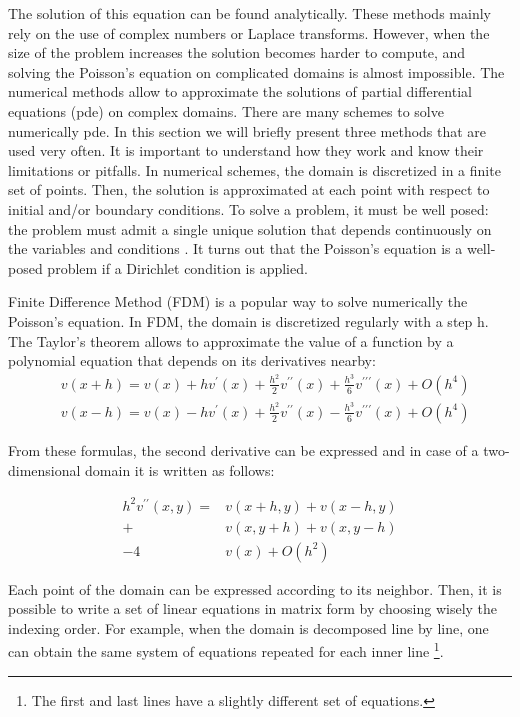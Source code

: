 \begin{refsection}
  The solution of this equation can be found analytically. These methods mainly rely on the use of complex numbers or Laplace transforms. However, when the size of the problem increases the solution becomes harder to compute, and solving the Poisson's equation on complicated domains is almost impossible. The numerical methods allow to approximate the solutions of partial differential equations (\acrshort{pde}) on complex domains. There are many schemes to solve numerically \acrshort{pde}. In this section we will briefly present three methods that are used very often. It is important to understand how they work and know their limitations or pitfalls. In numerical schemes, the domain is discretized in a finite set of points. Then, the solution is approximated at each point with respect to initial and/or boundary conditions. To solve a problem, it must be well posed: the problem must admit a single unique solution that depends continuously on the variables and conditions \cite{Hadamard1902}. It turns out that the Poisson's equation is a well-posed problem if a Dirichlet condition is applied.

  Finite Difference Method (FDM) is a popular way to solve numerically the Poisson’s equation. In FDM, the domain is discretized regularly with a step h. The Taylor's theorem allows to approximate the value of a function by a polynomial equation that depends on its derivatives nearby:  
  \begin{align}
     & v(x+h) = v(x)+hv^{\prime}(x)
    +\frac{h^2}{2}v^{\prime\prime}(x)+\frac{h^3}{6}v^{\prime\prime\prime}(x) + O(h^{4}) \\
     & v(x-h) = v(x)-hv^{\prime}(x)
    +\frac{h^2}{2}v^{\prime\prime}(x)-\frac{h^3}{6}v^{\prime\prime\prime}(x) + O(h^{4})
  \end{align}

  From these formulas, the second derivative can be expressed and in case of a two-dimensional domain it is written as follows:

  \begin{equation}
    \begin{split}
      h^{2}v^{\prime\prime}(x,y)=&v(x+h,y) + v(x-h,y) \\
      + &v(x,y+h) + v(x,y-h) \\
      - 4&v(x)+ O(h^{2})
    \end{split}
  \end{equation}

	Each point of the domain can be expressed according to its neighbor. Then, it is possible to write a set of linear equations in matrix form by choosing wisely the indexing order. For example, when the domain is decomposed line by line, one can obtain the same system of equations repeated for each inner line \footnote{The first and last lines have a slightly different set of equations.}. 


\end{refsection}
